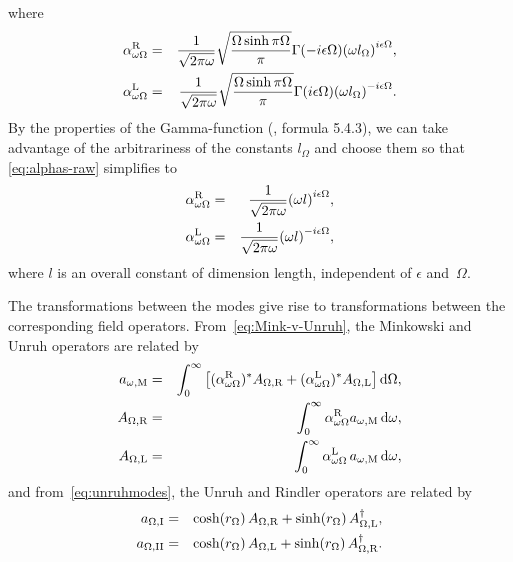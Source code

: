 where 
\begin{eqnarray}
\label{eq:alphas-raw}
\alpha^\text{\text{R}}_{\omega\Omega} &=&\frac{1}{\sqrt{2\pi\omega}}\sqrt{\frac{\Omega\sinh\pi\Omega}{\pi}}\Gamma(-i\epsilon\Omega){(\omega l_{\Omega})}^{i\epsilon\Omega} , \nonumber \\
\alpha^\text{\text{L}}_{\omega\Omega} &=& \frac{1}{\sqrt{2\pi\omega}}\sqrt{\frac{\Omega\sinh\pi\Omega}{\pi}}\Gamma(i\epsilon\Omega){(\omega l_{\Omega})}^{-i\epsilon\Omega}.
\end{eqnarray}
By the properties of the Gamma-function 
(\cite{NISTlibrary}, formula 5.4.3), we can take 
advantage of the arbitrariness of the constants 
$l_{\Omega}$ and choose them so that 
\eqref{eq:alphas-raw} simplifies to 
\begin{eqnarray}
\alpha^\text{\text{R}}_{\omega\Omega} &=&\frac{1}{\sqrt{2\pi\omega}}{(\omega l)}^{i\epsilon\Omega} , \nonumber \\
\alpha^\text{\text{L}}_{\omega\Omega} &=& \frac{1}{\sqrt{2\pi\omega}}{(\omega l)}^{-i\epsilon\Omega} , 
\label{eq:alphas}
\end{eqnarray}
where $l$ is an overall constant of dimension length, 
independent of $\epsilon$ and~$\Omega$. 

The transformations between the modes give rise to transformations between the corresponding field operators. From~\eqref{eq:Mink-v-Unruh}, 
the Minkowski and Unruh operators are related by 
\begin{eqnarray} 
\label{eq:Aaboth-transform}
a_{\omega,\text{M}} &=& \int_0^{\infty}\left[(\alpha^\text{\text{R}}_{\omega\Omega})^{\ast} A_{\Omega,\text{\text{R}}}+(\alpha^\text{\text{L}}_{\omega\Omega})^{\ast} A_{\Omega,\text{\text{L}}}\right] \text{d}\Omega , \nonumber \\
A_{\Omega,\text{\text{R}}} &=& \int_0^{\infty} \alpha^\text{\text{R}}_{\omega\Omega} a_{\omega,\text{M}} \, \text{d}\omega , \nonumber \\
A_{\Omega,\text{\text{L}}} &=& \int_0^{\infty} \alpha^\text{\text{L}}_{\omega\Omega} \, a_{\omega,\text{M}} \, \text{d}\omega,
\end{eqnarray}
and from~\eqref{eq:unruhmodes}, the Unruh and Rindler operators 
are related by 
\begin{eqnarray}
a_{\Omega,\text{I}} &=&  \cosh(r_\Omega)\,A_{\Omega, \text{R}} + \sinh(r_\Omega)\, A^\dag_{\Omega,\text{\text{L}}} , \notag \\
a_{\Omega,\text{II}} &=& \cosh(r_\Omega)\, A_{\Omega,\text{\text{L}}} + \sinh(r_\Omega)\, A^\dag_{\Omega,\text{\text{R}}}.
\label{eq:Mink-v-Unruh-operators}
\end{eqnarray}

